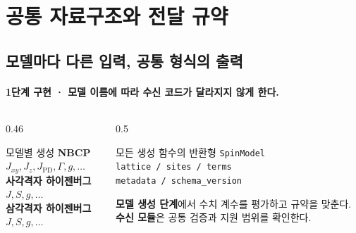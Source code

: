 
\section{공통 자료구조와 전달 규약}



\subsection{모델마다 다른 입력, 공통 형식의 출력}\label{common-interface}
\begingroup%
  \framesubtitle{1단계 구현 · 모델 이름에 따라 수신 코드가 달라지지 않게 한다.}
  \begin{columns}[T,onlytextwidth]
    \begin{column}{0.46\textwidth}
      \begin{block}{모델별 생성}
        \textbf{NBCP}\\
        $J_{xy},J_z,J_{\mathrm{PD}},\Gamma,g,\ldots$\\[0.7em]
        \textbf{사각격자 하이젠버그}\\
        $J,S,g,\ldots$\\[0.7em]
        \textbf{삼각격자 하이젠버그}\\
        $J,S,g,\ldots$
      \end{block}
    \end{column}
    \begin{column}{0.5\textwidth}
      \begin{block}{모든 생성 함수의 반환형}
        \texttt{SpinModel}\\[0.6em]
        \texttt{lattice / sites / terms}\\
        \texttt{metadata / schema\_version}
      \end{block}
      \medskip
      \textbf{모델 생성 단계}에서 수치 계수를 평가하고 규약을 맞춘다.\\[0.5em]
      \textbf{수신 모듈}은 공통 검증과 지원 범위를 확인한다.
    \end{column}
  \end{columns}
  \medskip
\endgroup


